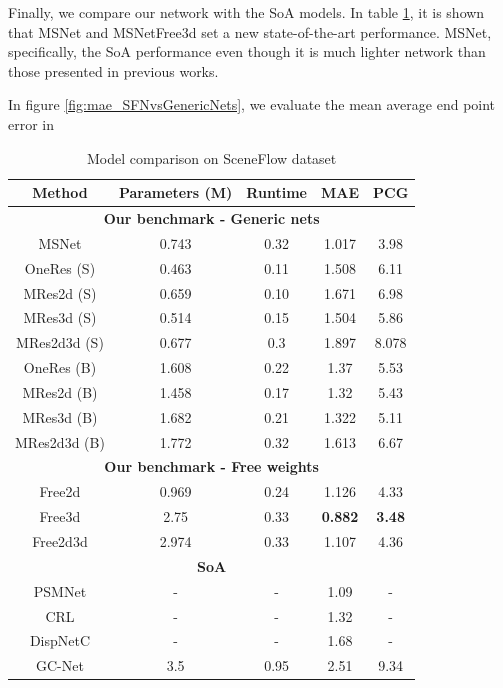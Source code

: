 \documentclass[10pt]{article}
\begin{document}
Finally, we compare our network with the SoA models. In table \ref{tab:results}, it is shown that MSNet and MSNetFree3d set a new state-of-the-art performance. MSNet, specifically, the SoA performance even though it is much lighter network than those presented in previous works.

In figure \ref{fig:mae_SFNvsGenericNets}, we evaluate the mean average end point error in  

\begin{table}[]
    \centering
    \begin{tabular}{ c|c|c|c|c }
    Method & Parameters (M) & Runtime & MAE & PCG \\
    
    \hline
    \multicolumn{5}{c}{ \textbf{Our benchmark - Generic nets} } \\
    \hline
    MSNet & 0.743 & 0.32 & 1.017 & 3.98 \\
    \hline
    OneRes (S) & 0.463 & 0.11 & 1.508 & 6.11 \\
    MRes2d (S) & 0.659 & 0.10 & 1.671 & 6.98 \\
    MRes3d (S) & 0.514 & 0.15 & 1.504 & 5.86 \\
    MRes2d3d (S) & 0.677 & 0.3 & 1.897 & 8.078 \\
    \hline
    OneRes (B) & 1.608 & 0.22 & 1.37 & 5.53 \\
    MRes2d (B) & 1.458 & 0.17 & 1.32 & 5.43 \\
    MRes3d (B) & 1.682 & 0.21 & 1.322 & 5.11 \\
    MRes2d3d (B) & 1.772 & 0.32 & 1.613 & 6.67 \\
    \hline
    \multicolumn{5}{c}{ \textbf{Our benchmark - Free weights} } \\
    \hline
    Free2d & 0.969 & 0.24 & 1.126 & 4.33 \\
    Free3d & 2.75 & 0.33 & \textbf{0.882} & \textbf{3.48} \\
    Free2d3d & 2.974 & 0.33 & 1.107 & 4.36 \\
    \hline
    \multicolumn{5}{c}{ \textbf{SoA} } \\
    \hline
    PSMNet\cite{Chang2018PyramidNetwork} & - & - & 1.09 & - \\
    CRL\cite{Pang2018CascadeMatching} & - & - & 1.32 & - \\
    DispNetC\cite{Mayer2016ALD} & - & - & 1.68 & - \\
    GC-Net\cite{Kendall2017End-to-EndRegression} & 3.5 & 0.95 & 2.51 & 9.34 \\
    
    \hline
    \end{tabular}
    \caption{Model comparison on SceneFlow dataset}
    \label{tab:results}
\end{table}
\end{document}
